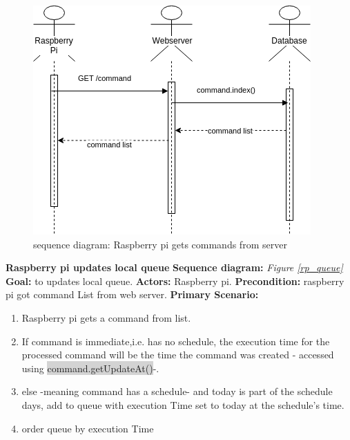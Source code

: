 \documentclass[12pt, oneside, a4paper]{book}
\newcommand{\code}[1]{{\color{red}\colorbox{lightgray}{#1}}}
\newcommand\boldcolor[1]{\textcolor{bold}{\textbf{#1}}}
\begin{document}
				\begin{figure}[H]
					\includegraphics[width=\linewidth]{img/sequece_rp_command.png}
					\caption{sequence diagram: Raspberry pi gets commands from server}					
					\label{rp_command_list}
				\end{figure}
				\newpage\hspace*{-6mm}\boldcolor{Raspberry pi updates local queue}
				\newline\textbf{Sequence diagram:} \textit{Figure \ref{rp_queue}}
				\newline\textbf{Goal:} to updates local queue.
				\newline\textbf{Actors:} Raspberry pi.
				\newline\textbf{Precondition:} raspberry pi got  command List from web server.
				\newline\textbf{Primary Scenario:}	
				\begin{enumerate}[label*=\arabic*.]
					\item Raspberry pi gets a command from list.
					\item If command is immediate,i.e. has no schedule, the execution time for the processed command will be the time the command was created - accessed using  \code{command.getUpdateAt()}-.
					\item else -meaning command has a schedule- and today is part of the schedule days, add to queue with execution Time set to today at the schedule's time.
					\item order queue by execution Time
				\end{enumerate}
\end{document}
